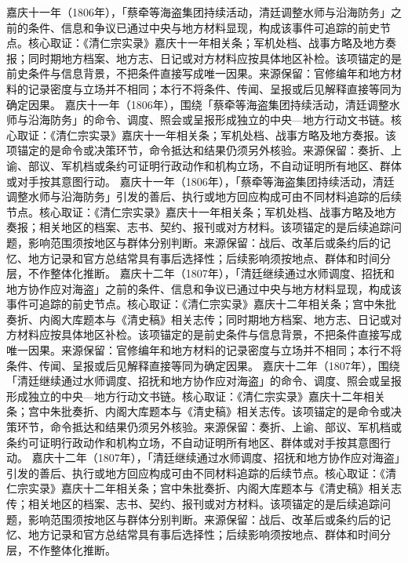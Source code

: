 嘉庆十一年（1806年），「蔡牵等海盗集团持续活动，清廷调整水师与沿海防务」之前的条件、信息和争议已通过中央与地方材料显现，构成该事件可追踪的前史节点。核心取证：《清仁宗实录》嘉庆十一年相关条；军机处档、战事方略及地方奏报；同时期地方档案、地方志、日记或对方材料应按具体地区补检。该项锚定的是前史条件与信息背景，不把条件直接写成唯一因果。来源保留：官修编年和地方材料的记录密度与立场并不相同；本行不将条件、传闻、呈报或后见解释直接等同为确定因果。
嘉庆十一年（1806年），围绕「蔡牵等海盗集团持续活动，清廷调整水师与沿海防务」的命令、调度、照会或呈报形成独立的中央—地方行动文书链。核心取证：《清仁宗实录》嘉庆十一年相关条；军机处档、战事方略及地方奏报。该项锚定的是命令或决策环节，命令抵达和结果仍须另外核验。来源保留：奏折、上谕、部议、军机档或条约可证明行政动作和机构立场，不自动证明所有地区、群体或对手按其意图行动。
嘉庆十一年（1806年），「蔡牵等海盗集团持续活动，清廷调整水师与沿海防务」引发的善后、执行或地方回应构成可由不同材料追踪的后续节点。核心取证：《清仁宗实录》嘉庆十一年相关条；军机处档、战事方略及地方奏报；相关地区的档案、志书、契约、报刊或对方材料。该项锚定的是后续追踪问题，影响范围须按地区与群体分别判断。来源保留：战后、改革后或条约后的记忆、地方记录和官方总结常具有事后选择性；后续影响须按地点、群体和时间分层，不作整体化推断。
嘉庆十二年（1807年），「清廷继续通过水师调度、招抚和地方协作应对海盗」之前的条件、信息和争议已通过中央与地方材料显现，构成该事件可追踪的前史节点。核心取证：《清仁宗实录》嘉庆十二年相关条；宫中朱批奏折、内阁大库题本与《清史稿》相关志传；同时期地方档案、地方志、日记或对方材料应按具体地区补检。该项锚定的是前史条件与信息背景，不把条件直接写成唯一因果。来源保留：官修编年和地方材料的记录密度与立场并不相同；本行不将条件、传闻、呈报或后见解释直接等同为确定因果。
嘉庆十二年（1807年），围绕「清廷继续通过水师调度、招抚和地方协作应对海盗」的命令、调度、照会或呈报形成独立的中央—地方行动文书链。核心取证：《清仁宗实录》嘉庆十二年相关条；宫中朱批奏折、内阁大库题本与《清史稿》相关志传。该项锚定的是命令或决策环节，命令抵达和结果仍须另外核验。来源保留：奏折、上谕、部议、军机档或条约可证明行政动作和机构立场，不自动证明所有地区、群体或对手按其意图行动。
嘉庆十二年（1807年），「清廷继续通过水师调度、招抚和地方协作应对海盗」引发的善后、执行或地方回应构成可由不同材料追踪的后续节点。核心取证：《清仁宗实录》嘉庆十二年相关条；宫中朱批奏折、内阁大库题本与《清史稿》相关志传；相关地区的档案、志书、契约、报刊或对方材料。该项锚定的是后续追踪问题，影响范围须按地区与群体分别判断。来源保留：战后、改革后或条约后的记忆、地方记录和官方总结常具有事后选择性；后续影响须按地点、群体和时间分层，不作整体化推断。
